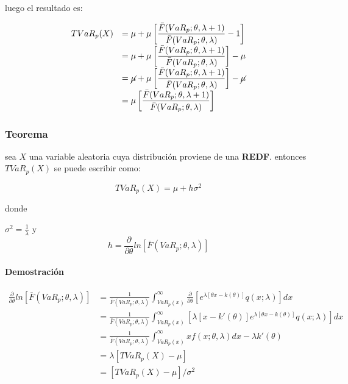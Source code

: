 \documentclass[]{article}
\begin{document}
luego el resultado es:

\[\begin{array}{rl}
TVaR_p(X) &\displaystyle= \mu + \mu \left[\frac{\bar{F}(VaR_p;\theta,\lambda+1)}{\bar{F}(VaR_p;\theta,\lambda)} - 1\right]\\
&\displaystyle= \mu + \mu \left[\frac{\bar{F}(VaR_p;\theta,\lambda+1)}{\bar{F}(VaR_p;\theta,\lambda)} \right]-\mu\\
&\displaystyle= \cancel{\mu} + \mu \left[\frac{\bar{F}(VaR_p;\theta,\lambda+1)}{\bar{F}(VaR_p;\theta,\lambda)} \right]-\cancel{\mu}\\
&\displaystyle=\mu \left[\frac{\bar{F}(VaR_p;\theta,\lambda+1)}{\bar{F}(VaR_p;\theta,\lambda)} \right]
\end{array}\]

\hypertarget{teorema-2}{%
\subsubsection{Teorema}\label{teorema-2}}

sea \(X\) una variable aleatoria cuya distribución proviene de una
\textbf{REDF}. entonces \(TVaR_p(X)\) se puede escribir como:

\[TVaR_p(X)= \mu + h \sigma^2\]

donde

\(\sigma^2 = \frac{1}{\lambda}\) y\\
\[h=\frac{\partial}{\partial \theta}ln[\bar{F}(VaR_p; \theta, \lambda)]\]

\hypertarget{demostracion-2}{%
\paragraph{Demostración}\label{demostracion-2}}

\[\begin{array}{rl}
\frac{\partial}{\partial \theta}ln[\bar{F}(VaR_p; \theta, \lambda)] &\displaystyle= \frac{1}{\bar{F}(VaR_p;\theta,\lambda)}  \int_{VaR_p(x)}^{\infty}\frac{\partial}{\partial \theta} \left[e^{\lambda[\theta x - k(\theta)]} q(x;\lambda)\right]dx \\
&\displaystyle= \frac{1}{\bar{F}(VaR_p;\theta,\lambda)}  \int_{VaR_p(x)}^{\infty} \left[\lambda[x - k'(\theta)]e^{\lambda[\theta x - k(\theta)]} q(x;\lambda)\right]dx\\
&\displaystyle= \frac{1}{\bar{F}(VaR_p;\theta,\lambda)} \int_{VaR_p(x)}^{\infty} x f(x;\theta , \lambda)dx - \lambda k'(\theta)\\
&\displaystyle= \lambda [ TVaR_p(X) - \mu ]\\
&\displaystyle= [ TVaR_p(X) - \mu]/  \sigma^2
\end{array}\]
\end{document}
